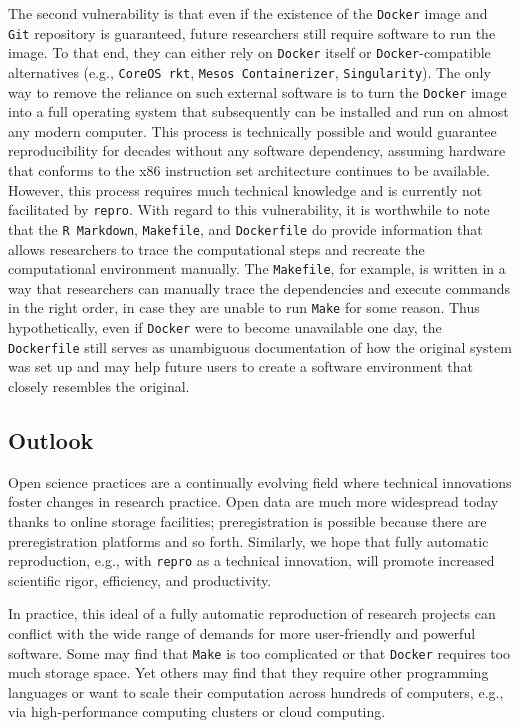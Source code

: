 \documentclass[psych,tutorial,submit,moreauthors,pdftex]{mdpi}
\begin{document}
The second vulnerability is that even if the existence of the
\texttt{Docker} image and \texttt{Git} repository is guaranteed, future
researchers still require software to run the image. To that end, they
can either rely on \texttt{Docker} itself or \texttt{Docker}-compatible
alternatives (e.g., \texttt{CoreOS\ rkt}, \texttt{Mesos\ Containerizer},
\texttt{Singularity}). The only way to remove the reliance on such
external software is to turn the \texttt{Docker} image into a full
operating system that subsequently can be installed and run on almost
any modern computer. This process is technically possible and would
guarantee reproducibility for decades without any software dependency,
assuming hardware that conforms to the x86 instruction set architecture
continues to be available. However, this process requires much technical
knowledge and is currently not facilitated by \texttt{repro}. With
regard to this vulnerability, it is worthwhile to note that the
\texttt{R\ Markdown}, \texttt{Makefile}, and \texttt{Dockerfile} do
provide information that allows researchers to trace the computational
steps and recreate the computational environment manually. The
\texttt{Makefile}, for example, is written in a way that researchers can
manually trace the dependencies and execute commands in the right order,
in case they are unable to run \texttt{Make} for some reason. Thus
hypothetically, even if \texttt{Docker} were to become unavailable one
day, the \texttt{Dockerfile} still serves as unambiguous documentation
of how the original system was set up and may help future users to
create a software environment that closely resembles the original.

\hypertarget{outlook}{%
\subsection{Outlook}\label{outlook}}

Open science practices are a continually evolving field where technical
innovations foster changes in research practice. Open data are much more
widespread today thanks to online storage facilities; preregistration is
possible because there are preregistration platforms and so forth.
Similarly, we hope that fully automatic reproduction, e.g., with
\texttt{repro} as a technical innovation, will promote increased
scientific rigor, efficiency, and productivity.

In practice, this ideal of a fully automatic reproduction of research
projects can conflict with the wide range of demands for more
user-friendly and powerful software. Some may find that \texttt{Make} is
too complicated or that \texttt{Docker} requires too much storage space.
Yet others may find that they require other programming languages or
want to scale their computation across hundreds of computers, e.g., via
high-performance computing clusters or cloud computing.
\end{document}
